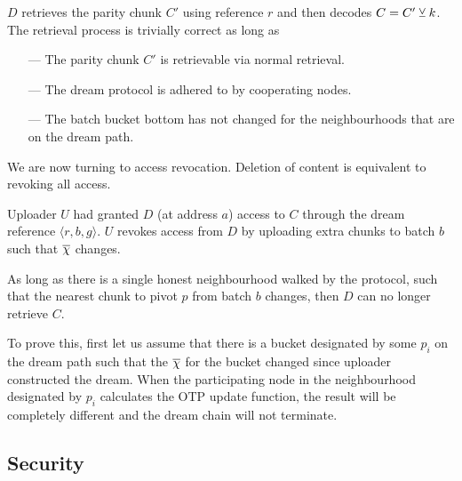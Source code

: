 $D$ retrieves the parity chunk $C'$ using reference $r$ and then decodes $C=C'\veebar k$.
The retrieval process is trivially correct as long as 
\begin{enumerate}[noitemsep]
\item[---]  The parity chunk $C'$ is retrievable via normal retrieval. 
\item[---] The dream protocol is adhered to by cooperating nodes.
\item[---] The batch bucket bottom has not changed for the neighbourhoods that are on the dream path. 
\end{enumerate}

We are now turning to access revocation. Deletion of content is equivalent to revoking all access.


Uploader $U$ had granted $D$ (at address $a$) access to $C$ through the dream reference $\langle r,b,g\rangle $. $U$ revokes access from $D$ by uploading extra chunks to batch $b$ such that $\overline{\Huge\chi}$ changes.

As long as there is a single honest neighbourhood walked by the protocol, such that the nearest chunk to pivot $p$ from batch $b$ changes, then $D$ can no longer retrieve $C$.

To prove this, first let us assume that there is a bucket designated by some $p_i$ on the dream path such that the $\overline{\Huge\chi}$ for the bucket changed since uploader constructed the dream. When the participating node in the neighbourhood designated by $p_i$ calculates the OTP update function, the result will be completely different and the dream chain will not terminate. \qedsymbol






\subsection{Security}


